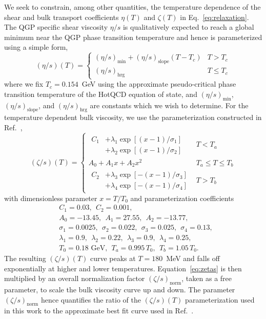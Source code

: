 \documentclass[aps,prc,reprint,amsmath,nofootinbib,superscriptaddress]{revtex4-1}
\begin{document}
We seek to constrain, among other quantities, the temperature dependence of the shear and bulk transport coefficients $\eta(T)$ and $\zeta(T)$ in Eq.~\eqref{eq:relaxation}.
The QGP specific shear viscosity $\eta/s$ is qualitatively expected to reach a global minimum near the QGP phase transition temperature and hence is parameterized using a simple form,
\begin{equation}
  (\eta/s)(T) =
  \begin{cases}
    (\eta/s)_\text{min} + (\eta/s)_\text{slope} (T - T_c) & T > T_c \\
    (\eta/s)_\text{hrg}                                   & T \le T_c
  \end{cases}
  \label{eq:etas}
\end{equation}
where we fix $T_c = 0.154$~GeV using the approximate pseudo-critical phase transition temperature of the HotQCD equation of state, and $(\eta/s)_\text{min}$, $(\eta/s)_\text{slope}$, and $(\eta/s)_\text{hrg}$ are constants which we wish to determine.
For the temperature dependent bulk viscosity, we use the parameterization constructed in Ref.~\cite{Denicol:2009am, Ryu:2015vwa},
\begin{equation}
  (\zeta/s)(T) =
  \begin{cases}
    \begin{aligned}
      C_1 &+ \lambda_1 \exp [(x-1)/\sigma_1]  \\ &+ \lambda_2 \exp [ (x-1)/\sigma_2]
    \end{aligned}
    &T < T_a \\[3ex]
    A_0 + A_1 x + A_2 x^2 &T_a \le T \le T_b \\[2ex]
    \begin{aligned}
      C_2 &+ \lambda_3 \exp [-(x-1)/\sigma_3]  \\ &+ \lambda_4 \exp [-(x-1)/\sigma_4]
    \end{aligned}
    &T > T_b
  \end{cases}
  \label{eq:zetas}
\end{equation}
with dimensionless parameter $x = T/T_0$ and parameterization coefficients
\begin{align*}
  &C_1=0.03, ~~C_2=0.001, \\
  &A_0=-13.45, ~~A_1=27.55, ~~A_2=-13.77, \\
  &\sigma_1=0.0025, ~~\sigma_2=0.022, ~~\sigma_3=0.025, ~~\sigma_4=0.13, \\
  &\lambda_1=0.9, ~~\lambda_2=0.22, ~~\lambda_3=0.9, ~~\lambda_4=0.25, \\
  &T_0 = 0.18 \text{ GeV}, ~~T_a = 0.995\, T_0, ~~T_b = 1.05\, T_0.
\end{align*}
The resulting $(\zeta/s)(T)$ curve peaks at $T=180$~MeV and falls off exponentially at higher and lower temperatures.
Equation~\eqref{eq:zetas} is then multiplied by an overall normalization factor $(\zeta/s)_\text{norm}$, taken as a free parameter, to scale the bulk viscosity curve up and down.
The parameter $(\zeta/s)_\text{norm}$ hence quantifies the ratio of the $(\zeta/s)(T)$ parameterization used in this work to the approximate best fit curve used in Ref.~\cite{Ryu:2015vwa}.
\end{document}
